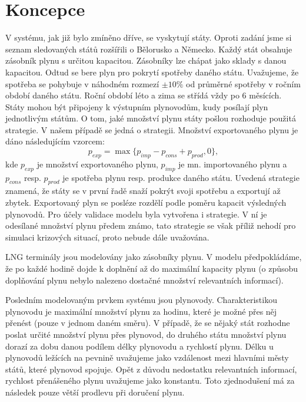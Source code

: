 \documentclass[a4paper,12pt]{article}
\begin{document}
  \section{Koncepce}
  V systému, jak již bylo zmíněno dříve, se vyskytují státy. Oproti zadání jsme si seznam sledovaných 
  států rozšířili o Bělorusko a Německo. Každý stát obsahuje zásobník plynu s určitou kapacitou. 
  Zásobníky lze chápat jako sklady s danou kapacitou.
  Odtud se bere plyn pro pokrytí spotřeby daného státu. Uvažujeme, že spotřeba se pohybuje v náhodném 
  rozmezí $\pm 10 \%$ od průměrné spotřeby v ročním období daného státu. Roční období léto a zima se 
  střídá vždy po 6 měsících. Státy mohou být připojeny k výstupním plynovodům, 
  kudy posílají plyn jednotlivým státům. O tom, jaké množství plynu státy pošlou rozhoduje použitá strategie. 
  V našem případě se jedná o  strategii. Množství exportovaného plynu je dáno následujícím vzorcem:
  $$
    p_{exp} = \max\{ p_{imp} - p_{cons} + p_{prod}, 0 \}, 
  $$
  kde $p_{exp}$ je množství exportovaného plynu, $p_{imp}$ je mn. importovaného plynu a $p_{cons}$ resp. 
  $p_{prod}$ je spotřeba plynu resp. produkce daného státu. Uvedená strategie znamená, že státy se v první 
  řadě snaží pokrýt svoji spotřebu a exportují až zbytek. Exportovaný plyn se posléze rozdělí podle poměru 
  kapacit výsledných plynovodů. Pro účely validace modelu byla vytvořena i  strategie. V ní je 
  odesílané množství plynu předem známo, tato strategie se však příliž nehodí pro simulaci krizových situací, 
  proto nebude dále uvažována. 
  
  LNG terminály jsou modelovány jako zásobníky plynu. V modelu předpokládáme, že po každé hodině dojde k 
  doplnění až do maximální kapacity plynu (o způsobu doplňování plynu nebylo nalezeno dostačné množství 
  relevantních informací).  
  
  Posledním modelovaným prvkem systému jsou plynovody. Charakteristikou plynovodu je maximální množství 
  plynu za hodinu, které je možné přes něj přenést (pouze v jednom daném směru). V případě, že se nějaký stát rozhodne poslat určité 
  množství plynu přes plynovod, do druhého státu množství plynu dorazí za dobu danou podílem délky 
  plynovodu a rychlostí plynu. Délku u plynovodů ležících na pevnině uvažujeme jako vzdálenost mezi 
  hlavními městy států, které plynovod spojuje. Opět z důvodu nedostatku relevantních informací, rychlost 
  přenášeného plynu uvažujeme jako konstantu. Toto zjednodušení má za následek pouze větší prodlevu při 
  doručení plynu.
  
\end{document}
